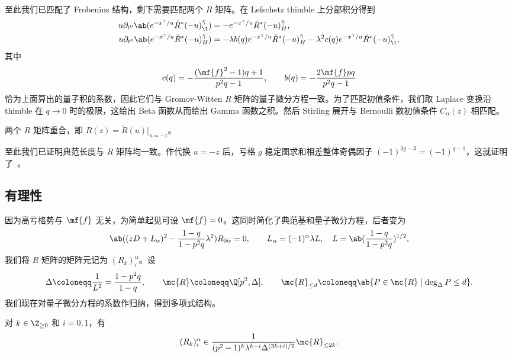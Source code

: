 至此我们已匹配了 Frobenius 结构，剩下需要匹配两个 \(R\) 矩阵。在 Lefschetz thimble 上分部积分得到
\begin{align*}
    u \partial_{t^0}\ab(e^{-x^{\gamma}/u}\check{R}^*(-u)^{\bar{\gamma}}_{\1}) &= -e^{-x^{\gamma}/u}\check{R}^*(-u)^{\bar{\gamma}}_H, \\
    u\partial_{t^0}\ab(e^{-x^{\gamma}/u}\check{R}^*(-u)^{\bar{\gamma}}_H) &= -\lambda b(q)e^{-x^{\gamma}/u}\check{R}^*(-u)^{\bar{\gamma}}_H - \lambda^2 c(q) e^{-x^{\gamma}/u}\check{R}^*(-u)^{\bar{\gamma}}_{\1},
\end{align*}
其中
\[ c(q) = -\frac{(\mf{f}^2-1)q+1}{p^2q-1}, \qquad b(q) = -\frac{2\mf{f}pq}{p^2q-1} \]
恰为上面算出的量子积的系数，因此它们与 Gromov-Witten \(R\) 矩阵的量子微分方程一致。为了匹配初值条件，我们取 Laplace 变换沿 thimble 在 \(q \to 0\) 时的极限，这给出 Beta 函数从而给出 Gamma 函数之积。然后 Stirling 展开与 Bernoulli 数初值条件 \(C_{\alpha}(z)\) 相匹配。

\begin{prop}%
\label{prop:R matrices coincide}
    两个 \(R\) 矩阵重合，即 \(R(z) = \check{R}(u)|_{u=-z}\)。
\end{prop}

至此我们已证明典范长度与 \(R\) 矩阵均一致。作代换 \(u = -z\) 后，亏格 \(g\) 稳定图求和相差整体奇偶因子 \((-1)^{3g-3} = (-1)^{g-1}\)，这就证明了~。

\subsection{有理性}%
\label{sub:Rationality}

因为高亏格势与 \(\mf{f}\) 无关，为简单起见可设 \(\mf{f} = 0\)。这同时简化了典范基和量子微分方程，后者变为
\[ \ab((zD+L_{\alpha})^2 - \frac{1-q}{1-p^2q}\lambda^2)R_{0\bar{\alpha}} = 0, \qquad L_{\alpha} = (-1)^{\alpha}\lambda L, \quad L = \ab(\frac{1-q}{1-p^2q})^{1/2}, \]
我们将 \(R\) 矩阵的矩阵元记为 \((R_k)_i^{\alpha}\)。设
\[ \Delta \coloneqq \frac{1}{L^2} = \frac{1-p^2q}{1-q}, \qquad \mc{R} \coloneqq \Q[p^2,\Delta], \qquad \mc{R}_{\leq d} \coloneqq \ab\{P \in \mc{R} \mid \deg_{\Delta} P \leq d\}. \]
我们现在对量子微分方程的系数作归纳，得到多项式结构。

\begin{prop}%
\label{prop:R matrix polynomiality}
    对 \(k \in \Z_{\geq0}\) 和 \(i = 0,1\)，有
    \[ (R_k)_i^{\alpha} \in \frac{1}{(p^2-1)^k \lambda^{k-i}\Delta^{(3k+i)/2}}\mc{R}_{\leq 2k}. \]
\end{prop}

